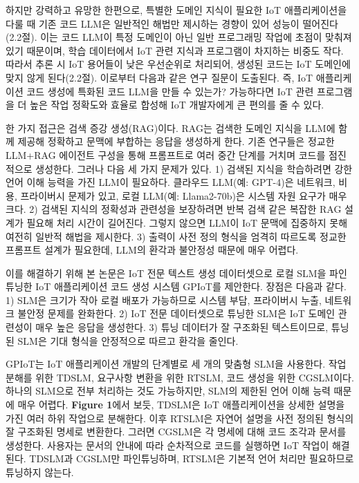\documentclass[sigconf,nonacm]{acmart}
\begin{document}
하지만 강력하고 유망한 한편으로, 특별한 도메인 지식이 필요한 IoT 애플리케이션을 다룰 때 기존 코드 LLM은 일반적인 해법만 제시하는 경향이 있어 성능이 떨어진다(2.2절). 이는 코드 LLM이 특정 도메인이 아닌 일반 프로그래밍 작업에 초점이 맞춰져 있기 때문이며, 학습 데이터에서 IoT 관련 지식과 프로그램이 차지하는 비중도 작다. 따라서 추론 시 IoT 용어들이 낮은 우선순위로 처리되어, 생성된 코드는 IoT 도메인에 맞지 않게 된다(2.2절). 이로부터 다음과 같은 연구 질문이 도출된다. 즉, IoT 애플리케이션 코드 생성에 특화된 코드 LLM을 만들 수 있는가? 가능하다면 IoT 관련 프로그램을 더 높은 작업 정확도와 효율로 합성해 IoT 개발자에게 큰 편의를 줄 수 있다.

한 가지 접근은 검색 증강 생성(RAG)이다. RAG는 검색한 도메인 지식을 LLM에 함께 제공해 정확하고 문맥에 부합하는 응답을 생성하게 한다. 기존 연구들은 정교한 LLM+RAG 에이전트 구성을 통해 프롬프트로 여러 중간 단계를 거치며 코드를 점진적으로 생성한다. 그러나 다음 세 가지 문제가 있다. 1) 검색된 지식을 학습하려면 강한 언어 이해 능력을 가진 LLM이 필요하다. 클라우드 LLM(예: GPT-4)은 네트워크, 비용, 프라이버시 문제가 있고, 로컬 LLM(예: Llama2-70b)은 시스템 자원 요구가 매우 크다. 2) 검색된 지식의 정확성과 관련성을 보장하려면 반복 검색 같은 복잡한 RAG 설계가 필요해 처리 시간이 길어진다. 그렇지 않으면 LLM이 IoT 문맥에 집중하지 못해 여전히 일반적 해법을 제시한다. 3) 출력이 사전 정의 형식을 엄격히 따르도록 정교한 프롬프트 설계가 필요한데, LLM의 환각과 불안정성 때문에 매우 어렵다.

이를 해결하기 위해 본 논문은 IoT 전문 텍스트 생성 데이터셋으로 로컬 SLM을 파인튜닝한 IoT 애플리케이션 코드 생성 시스템 GPIoT를 제안한다. 장점은 다음과 같다. 1) SLM은 크기가 작아 로컬 배포가 가능하므로 시스템 부담, 프라이버시 누출, 네트워크 불안정 문제를 완화한다. 2) IoT 전문 데이터셋으로 튜닝한 SLM은 IoT 도메인 관련성이 매우 높은 응답을 생성한다. 3) 튜닝 데이터가 잘 구조화된 텍스트이므로, 튜닝된 SLM은 기대 형식을 안정적으로 따르고 환각을 줄인다.

GPIoT는 IoT 애플리케이션 개발의 단계별로 세 개의 맞춤형 SLM을 사용한다. 작업 분해를 위한 TDSLM, 요구사항 변환을 위한 RTSLM, 코드 생성을 위한 CGSLM이다. 하나의 SLM으로 전부 처리하는 것도 가능하지만, SLM의 제한된 언어 이해 능력 때문에 매우 어렵다. \textbf{Figure 1}에서 보듯, TDSLM은 IoT 애플리케이션을 상세한 설명을 가진 여러 하위 작업으로 분해한다. 이후 RTSLM은 자연어 설명을 사전 정의된 형식의 잘 구조화된 명세로 변환한다. 그러면 CGSLM은 각 명세에 대해 코드 조각과 문서를 생성한다. 사용자는 문서의 안내에 따라 순차적으로 코드를 실행하면 IoT 작업이 해결된다. TDSLM과 CGSLM만 파인튜닝하며, RTSLM은 기본적 언어 처리만 필요하므로 튜닝하지 않는다.
\end{document}

